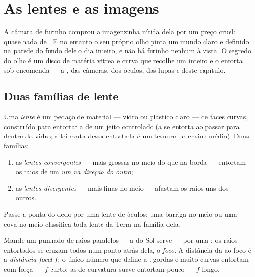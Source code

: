 \chapter{As lentes e as imagens}\label{ch:g8:lenses-images}

A câmara de furinho comprou a imagenzinha nítida dela por um preço
cruel: quase nada de . E no entanto o seu próprio olho pinta um
mundo claro e definido na parede do fundo dele o dia inteiro, e não há
furinho nenhum à vista. O segredo do olho é um disco de matéria
vítrea e curva que recolhe um  inteiro e o entorta sob encomenda
--- a ,  das câmeras, dos óculos, das lupas e deste
capítulo.

\section{Duas famílias de lente}

\begin{definition}\label{def:g8:lenses-images:families}
Uma \emph{lente} é um pedaço de material 
--- vidro ou plástico claro --- de faces curvas, construído para
entortar a  de um jeito controlado (a  se entorta ao passar
para dentro do vidro; a lei exata dessa entortada é um tesouro do
ensino médio). Duas famílias:
\begin{enumerate}
  \item as \emph{lentes convergentes} ---
        mais grossas no meio do que na borda --- entortam os raios de
        um  \emph{um na direção do outro};
  \item as \emph{lentes divergentes} ---
        mais finas no meio --- afastam os raios uns dos outros.
\end{enumerate}
Passe a ponta do dedo por uma lente de óculos: uma barriga no meio ou
uma cova no meio classifica toda lente da Terra na família dela.
\end{definition}

\begin{definition}\label{def:g8:lenses-images:focus}
Mande um punhado de raios paralelos --- a  do Sol serve --- por uma
: os raios entortados se cruzam todos num ponto
atrás dela, o \emph{foco}. A distância da  ao foco é
a \emph{distância focal} $f$: o único número
que define a .  gordas e muito curvas entortam com força
--- $f$ curto; as de curvatura suave entortam pouco --- $f$ longo.
\end{definition}

